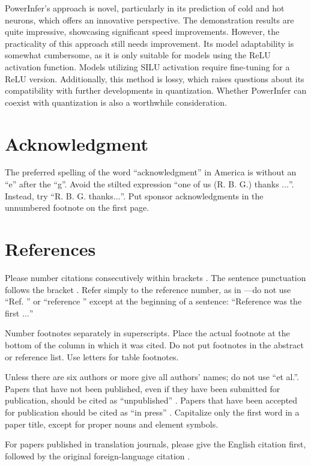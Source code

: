 \documentclass[conference]{IEEEtran}
\begin{document}
PowerInfer's approach is novel, particularly in its prediction of cold and hot neurons, which offers an innovative perspective. The demonstration results are quite impressive, showcasing significant speed improvements. However, the practicality of this approach still needs improvement. Its model adaptability is somewhat cumbersome, as it is only suitable for models using the ReLU activation function. Models utilizing SILU activation require fine-tuning for a ReLU version. Additionally, this method is lossy, which raises questions about its compatibility with further developments in quantization. Whether PowerInfer can coexist with quantization is also a worthwhile consideration.

\section*{Acknowledgment}


The preferred spelling of the word ``acknowledgment'' in America is without
an ``e'' after the ``g''. Avoid the stilted expression ``one of us (R. B.
G.) thanks $\ldots$''. Instead, try ``R. B. G. thanks$\ldots$''. Put sponsor
acknowledgments in the unnumbered footnote on the first page.

\section*{References}

Please number citations consecutively within brackets \cite{b1}. The
sentence punctuation follows the bracket \cite{b2}. Refer simply to the reference
number, as in \cite{b3}---do not use ``Ref. \cite{b3}'' or ``reference \cite{b3}'' except at
the beginning of a sentence: ``Reference \cite{b3} was the first $\ldots$''

Number footnotes separately in superscripts. Place the actual footnote at
the bottom of the column in which it was cited. Do not put footnotes in the
abstract or reference list. Use letters for table footnotes.

Unless there are six authors or more give all authors' names; do not use
``et al.''. Papers that have not been published, even if they have been
submitted for publication, should be cited as ``unpublished'' \cite{b4}. Papers
that have been accepted for publication should be cited as ``in press'' \cite{b5}.
Capitalize only the first word in a paper title, except for proper nouns and
element symbols.

For papers published in translation journals, please give the English
citation first, followed by the original foreign-language citation \cite{b6}.
\end{document}
